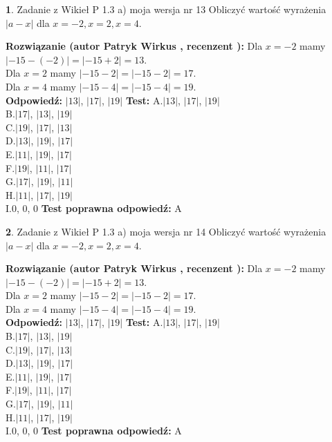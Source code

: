 \documentclass[12pt, a4paper]{article}
\theoremstyle{definition} %
\newtheorem{zad}{}
\newcommand{\zadStart}[1]{\begin{zad}#1\newline}
\newcommand{\zadStop}{\end{zad}}
\newcommand{\rozwStart}[2]{\noindent \textbf{Rozwiązanie (autor #1 , recenzent #2): }\newline}
\newcommand{\rozwStop}{\newline}
\newcommand{\odpStart}{\noindent \textbf{Odpowiedź:}\newline}
\newcommand{\odpStop}{\newline}
\newcommand{\testStart}{\noindent \textbf{Test:}\newline}
\newcommand{\testStop}{\newline}
\newcommand{\kluczStart}{\noindent \textbf{Test poprawna odpowiedź:}\newline}
\newcommand{\kluczStop}{\newline}
\begin{document}
\zadStart{Zadanie z Wikieł P 1.3 a) moja wersja nr 13}
Obliczyć wartość wyrażenia $|a - x|$ dla $x=-2,x=2,x=4$.
\zadStop
\rozwStart{Patryk Wirkus}{}
Dla $x = -2$ mamy $|-15 - (-2)| = |-15 + 2| = 13$.\\
Dla $x = 2$ mamy $|-15 - 2| = |-15 - 2| = 17$.\\
Dla $x = 4$ mamy $|-15 - 4| = |-15 - 4| = 19$.\\
\rozwStop
\odpStart
$|13|$, $|17|$, $|19|$
\odpStop
\testStart
A.$|13|$, $|17|$, $|19|$\\
B.$|17|$, $|13|$, $|19|$\\
C.$|19|$, $|17|$, $|13|$\\
D.$|13|$, $|19|$, $|17|$\\
E.$|11|$, $|19|$, $|17|$\\
F.$|19|$, $|11|$, $|17|$\\
G.$|17|$, $|19|$, $|11|$\\
H.$|11|$, $|17|$, $|19|$\\
I.$0$, $0$, $0$
\testStop
\kluczStart
A
\kluczStop



\zadStart{Zadanie z Wikieł P 1.3 a) moja wersja nr 14}
Obliczyć wartość wyrażenia $|a - x|$ dla $x=-2,x=2,x=4$.
\zadStop
\rozwStart{Patryk Wirkus}{}
Dla $x = -2$ mamy $|-15 - (-2)| = |-15 + 2| = 13$.\\
Dla $x = 2$ mamy $|-15 - 2| = |-15 - 2| = 17$.\\
Dla $x = 4$ mamy $|-15 - 4| = |-15 - 4| = 19$.\\
\rozwStop
\odpStart
$|13|$, $|17|$, $|19|$
\odpStop
\testStart
A.$|13|$, $|17|$, $|19|$\\
B.$|17|$, $|13|$, $|19|$\\
C.$|19|$, $|17|$, $|13|$\\
D.$|13|$, $|19|$, $|17|$\\
E.$|11|$, $|19|$, $|17|$\\
F.$|19|$, $|11|$, $|17|$\\
G.$|17|$, $|19|$, $|11|$\\
H.$|11|$, $|17|$, $|19|$\\
I.$0$, $0$, $0$
\testStop
\kluczStart
A
\kluczStop
\end{document}
